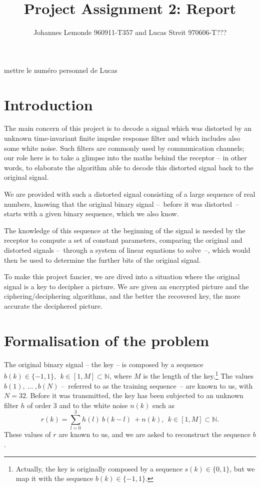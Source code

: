 \documentclass[twocolumn, 12pt]{IEEEtran}
\begin{document}
\title{Project Assignment 2: Report}
\author{Johannes Lemonde 960911-T357 and Lucas Streit 970606-T???}
mettre le numéro personnel de Lucas

\maketitle

\section{Introduction}

The main concern of this project is to decode a signal which was distorted by an unknown time-invariant finite impulse response filter and which includes also some white noise. Such filters are commonly used by communication channels; our role here is to take a glimpse into the maths behind the receptor -- in other words, to elaborate the algorithm able to decode this distorted signal back to the original signal.

We are provided with such a distorted signal consisting of a large sequence of real numbers, knowing that the original binary signal --~before it was distorted~-- starts with a given binary sequence, which we also know.

The knowledge of this sequence at the beginning of the signal is needed by the receptor to compute a set of constant parameters, comparing the original and distorted signals --~through a system of linear equations to solve~--, which would then be used to determine the further bits of the original signal.

To make this project fancier, we are dived into a situation where the original signal is a key to decipher a picture. We are given an encrypted picture and the ciphering/deciphering algorithms, and the better the recovered key, the more accurate the deciphered picture.

\section{Formalisation of the problem}

 The original binary signal -- the key -- is composed by a sequence ${b(k)\in \{-1,1\}}, ~~{k\in[1, M]\subset\mathbb{N}}$, where $M$ is the length of the key.\footnote{Actually, the key is originally composed by a sequence ${s(k)\in\{0,1\}}$, but we map it with the sequence ${b(k)\in\{-1, 1\}}$.}
 The values ${b(1),~\dots~, b(N)}$ --~referred to as the training sequence~-- are known to us, with ${N=32}$.
 Before it was transmitted, the key has been subjected to an unknown filter $h$ of order ${3}$ and to the white noise $n(k)$ such as 
 \begin{equation}\label{eq:r}
 { r(k) = \sum\limits_{l=0}^{3}h(l)~b(k-l)~+n(k),~~k\in[1,M]\subset\mathbb{N} }.
 \end{equation}
 These values of $r$ are known to us, and we are asked to reconstruct the sequence $b$.
 
\end{document}
